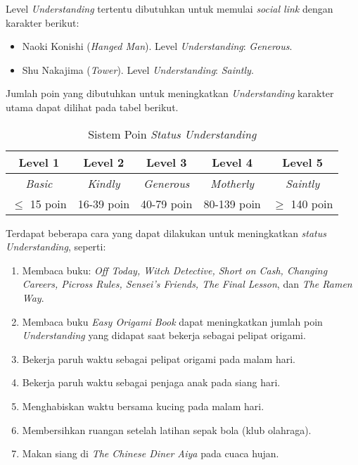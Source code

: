 Level \textit{Understanding} tertentu dibutuhkan untuk memulai \textit{social link} dengan karakter berikut:
\begin{itemize}
    \item Naoki Konishi (\textit{Hanged Man}). Level \textit{Understanding}: \textit{Generous}.
    \item Shu Nakajima (\textit{Tower}). Level \textit{Understanding}: \textit{Saintly}.
\end{itemize}

Jumlah poin yang dibutuhkan untuk meningkatkan \textit{Understanding} karakter utama dapat dilihat pada tabel berikut.
\begin{table}[htb]
    \begin{center}
        \begin{tabular}{ | c | c | c | c | c | }
            \hline
            Level 1        & Level 2         & Level 3           & Level 4           & Level 5          \\
            \hline
            \textit{Basic} & \textit{Kindly} & \textit{Generous} & \textit{Motherly} & \textit{Saintly} \\
            \hline
            $\le$ 15 poin  & 16-39 poin      & 40-79 poin        & 80-139 poin       & $\ge$ 140 poin   \\
            \hline
        \end{tabular}
    \end{center}
    \caption{Sistem Poin \textit{Status Understanding}}

\end{table}

Terdapat beberapa cara yang dapat dilakukan untuk meningkatkan \textit{status Understanding}, seperti:
\begin{enumerate}
    \item Membaca buku: \textit{Off Today, Witch Detective, Short on Cash, Changing Careers, Picross Rules, Sensei’s Friends, The Final Lesson}, dan \textit{The Ramen Way}.
    \item Membaca buku \textit{Easy Origami Book} dapat meningkatkan jumlah poin \textit{Understanding} yang didapat saat bekerja sebagai pelipat origami.
    \item Bekerja paruh waktu sebagai pelipat origami pada malam hari.
    \item Bekerja paruh waktu sebagai penjaga anak pada siang hari.
    \item Menghabiskan waktu bersama kucing pada malam hari.
    \item Membersihkan ruangan setelah latihan sepak bola (klub olahraga).
    \item Makan siang di \textit{The Chinese Diner Aiya} pada cuaca hujan.
\end{enumerate}

